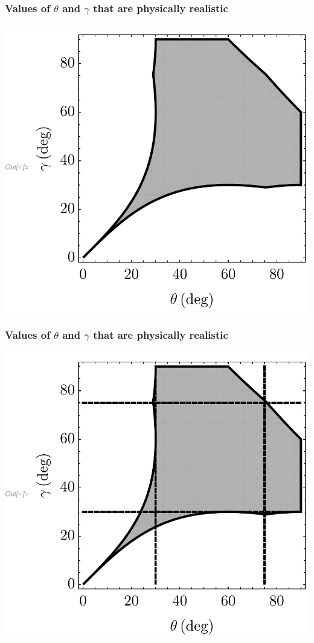 \documentclass{beamer}
\begin{document}
\begin{frame}
\frametitle{Values of $\theta$  and $\gamma$ that are physically realistic}
    \centering
    \includegraphics[width=\textwidth,height=.8\textheight,keepaspectratio]{anglediagram1.pdf}
\end{frame}
\begin{frame}
\frametitle{Values of $\theta$  and $\gamma$ that are physically realistic}
    \centering
    \includegraphics[width=\textwidth,height=.8\textheight,keepaspectratio]{anglediagram2.pdf}
\end{frame}
\end{document}
